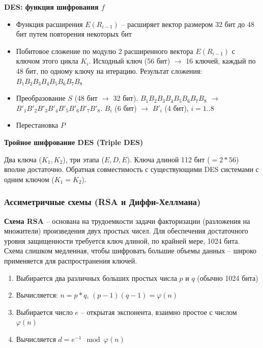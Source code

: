 \textbf{DES: функция шифрования $f$}

\begin{itemize}
    \item Функция расширения $E(R_{i-1})$ -- расширяет вектор размером 32 бит до 48 бит путем повторения некоторых бит
    \item Побитовое сложение по модулю 2 расширенного вектора $E(R_{i-1})$ с ключом этого цикла $K_i$. Исходный ключ (56 бит) $\rightarrow$ 16 ключей, каждый по 48 бит, по одному ключу на итерацию. Результат сложения: $B_1B_2B_3B_4B_5B_6B_7B_8$
\end{itemize}

\begin{itemize}
    \item Преобразование $S$ (48 бит $\rightarrow$ 32 бит).
    $B_1B_2B_3B_4B_5B_6B_7B_8$ $\rightarrow$ $B'_1B'_2B'_3B'_4B'_5B'_6B'_7B'_8$.
    $B_i$ (6 бит) $\rightarrow$ $B'_i$ (4 бит), $i = 1..8$
    \item Перестановка $P$
\end{itemize}

\textbf{Тройное шифрование DES (Triple DES)}

Два ключа ($K_1, K_2$), три этапа ($E, D, E$). Ключа длиной 112 бит ($= 2 * 56$) вполне достаточно. Обратная совместимость с существующими DES системами с одним ключом ($K_1 = K_2$).

\subsubsection{Ассиметричные схемы (RSA и Диффи-Хеллмана)}

\textbf{Схема RSA} -- основана на трудоемкости задачи факторизации (разложения на множители) произведения двух простых чисел. Для обеспечения достаточного уровня защищенности требуется ключ длиной, по крайней мере, 1024 бита. Схема слишком медленная, чтобы шифровать большие объемы данных – широко применяется для распространения ключей.

\begin{enumerate}
    \item Выбирается два различных больших простых числа $p$ и $q$ (обычно 1024 бита)
    \item Вычисляется: $n = p*q$, $(p - 1)(q - 1) = \varphi(n)$
    \item Выбирается число $e$ -- открытая экспонента, взаимно простое с числом $\varphi(n)$
    \item Вычисляется $d = e^{-1} \mod \varphi(n)$
\end{enumerate}


